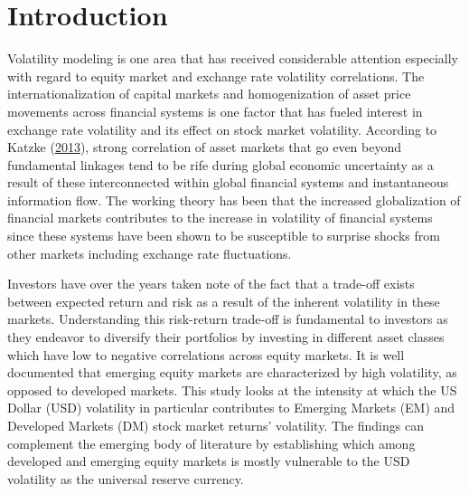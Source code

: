 \documentclass[11pt,preprint, authoryear]{elsarticle}
\numberwithin{equation}{section}
\numberwithin{figure}{section}
\numberwithin{table}{section}
\begin{document}
\pagestyle{fancy}
\chead{}
\rhead{}
\lfoot{}
\lhead{}
\cfoot{}


\headsep 35pt %




\hypertarget{introduction}{%
\section{\texorpdfstring{Introduction
\label{Introduction}}{Introduction }}\label{introduction}}

Volatility modeling is one area that has received considerable attention
especially with regard to equity market and exchange rate volatility
correlations. The internationalization of capital markets and
homogenization of asset price movements across financial systems is one
factor that has fueled interest in exchange rate volatility and its
effect on stock market volatility. According to Katzke
(\protect\hyperlink{ref-katzke2013}{2013}), strong correlation of asset
markets that go even beyond fundamental linkages tend to be rife during
global economic uncertainty as a result of these interconnected within
global financial systems and instantaneous information flow. The working
theory has been that the increased globalization of financial markets
contributes to the increase in volatility of financial systems since
these systems have been shown to be susceptible to surprise shocks from
other markets including exchange rate fluctuations.

Investors have over the years taken note of the fact that a trade-off
exists between expected return and risk as a result of the inherent
volatility in these markets. Understanding this risk-return trade-off is
fundamental to investors as they endeavor to diversify their portfolios
by investing in different asset classes which have low to negative
correlations across equity markets. It is well documented that emerging
equity markets are characterized by high volatility, as opposed to
developed markets. This study looks at the intensity at which the US
Dollar (USD) volatility in particular contributes to Emerging Markets
(EM) and Developed Markets (DM) stock market returns' volatility. The
findings can complement the emerging body of literature by establishing
which among developed and emerging equity markets is mostly vulnerable
to the USD volatility as the universal reserve currency.
\end{document}
